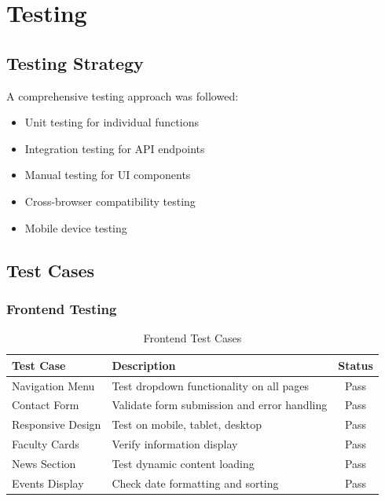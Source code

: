 \documentclass[12pt,a4paper]{report}
\begin{document}
\chapter{Testing}
\label{chap:testing}

\section{Testing Strategy}
A comprehensive testing approach was followed:
\begin{itemize}
    \item Unit testing for individual functions
    \item Integration testing for API endpoints
    \item Manual testing for UI components
    \item Cross-browser compatibility testing
    \item Mobile device testing
\end{itemize}

\section{Test Cases}
\subsection{Frontend Testing}
\begin{table}[h]
    \centering
    \begin{tabular}{|l|p{6cm}|c|}
        \hline
        \textbf{Test Case} & \textbf{Description} & \textbf{Status} \\
        \hline
        Navigation Menu & Test dropdown functionality on all pages & Pass \\
        Contact Form & Validate form submission and error handling & Pass \\
        Responsive Design & Test on mobile, tablet, desktop & Pass \\
        Faculty Cards & Verify information display & Pass \\
        News Section & Test dynamic content loading & Pass \\
        Events Display & Check date formatting and sorting & Pass \\
        \hline
    \end{tabular}
    \caption{Frontend Test Cases}
    \label{tab:frontend_tests}
\end{table}
\end{document}
